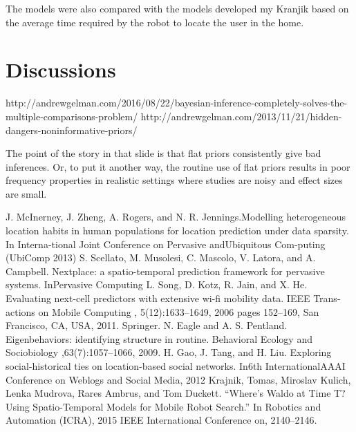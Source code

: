 \documentclass[11pt]{report}
\begin{document}

The models were also compared with the models developed my Kranjik  based on the average time required by the robot to locate the user in the home.





\section{Discussions}

http://andrewgelman.com/2016/08/22/bayesian-inference-completely-solves-the-multiple-comparisons-problem/
http://andrewgelman.com/2013/11/21/hidden-dangers-noninformative-priors/

The point of the story in that slide is that flat priors consistently give bad inferences. Or, to put it another way, the routine use of flat priors results in poor frequency properties in realistic settings where studies are noisy and effect sizes are small.
\label{sec:}




\begin{thebibliography}{99}

 J.  McInerney,  J.  Zheng,  A.  Rogers,  and  N.  R.  Jennings.Modelling heterogeneous location habits in human populations for location prediction under data sparsity. In Interna-tional Joint Conference on Pervasive andUbiquitous Com-puting (UbiComp 2013)
  S.  Scellato,   M.  Musolesi,   C.  Mascolo,   V.  Latora,   and A.  Campbell. Nextplace:   a  spatio-temporal  prediction framework for pervasive systems.  InPervasive Computing
 L. Song, D. Kotz, R. Jain, and X. He.  Evaluating next-cell predictors with extensive wi-fi mobility data. IEEE Trans-actions on Mobile Computing , 5(12):1633–1649, 2006 pages 152–169, San Francisco, CA, USA, 2011. Springer.
N. Eagle and A. S. Pentland.   Eigenbehaviors:  identifying structure in routine. Behavioral Ecology and Sociobiology ,63(7):1057–1066, 2009.
 H.  Gao,  J.  Tang,  and  H.  Liu.   Exploring  social-historical ties on location-based social networks.  In6th InternationalAAAI Conference on Weblogs and Social Media, 2012
 Krajnik, Tomas, Miroslav Kulich, Lenka Mudrova, Rares Ambrus, and Tom Duckett. “Where’s Waldo at Time T? Using Spatio-Temporal Models for Mobile Robot Search.” In Robotics and Automation (ICRA), 2015 IEEE International Conference on, 2140–2146.

\end{thebibliography}
\end{document}

